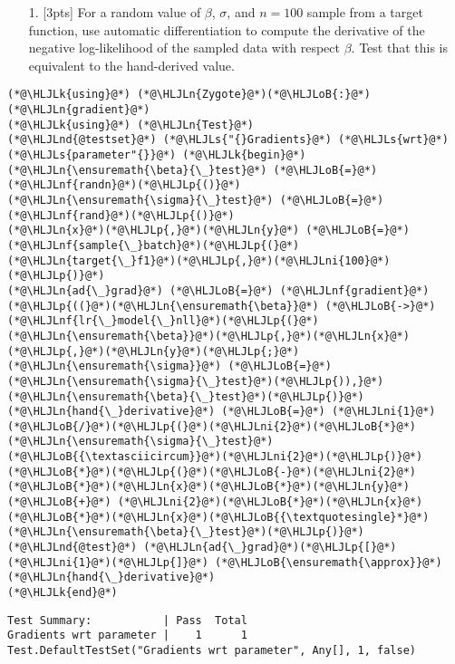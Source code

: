 \documentclass[12pt,a4paper]{article}
\newcommand{\HLJLk}[1]{\textcolor[RGB]{148,91,176}{\textbf{#1}}}
\newcommand{\HLJLn}[1]{#1}
\newcommand{\HLJLnd}[1]{\textcolor[RGB]{214,102,97}{#1}}
\newcommand{\HLJLnf}[1]{\textcolor[RGB]{66,102,213}{#1}}
\newcommand{\HLJLs}[1]{\textcolor[RGB]{201,61,57}{#1}}
\newcommand{\HLJLni}[1]{\textcolor[RGB]{59,151,46}{#1}}
\newcommand{\HLJLoB}[1]{\textcolor[RGB]{102,102,102}{\textbf{#1}}}
\newcommand{\HLJLp}[1]{#1}
\begin{document}
\begin{itemize}
\item[1. ] [3pts] For a random value of $\beta$, $\sigma$, and $n=100$ sample from a target function,  use automatic differentiation to compute the derivative of the negative log-likelihood of the sampled data  with respect $\beta$.  Test that this is equivalent to the hand-derived value.

\end{itemize}

\begin{lstlisting}
(*@\HLJLk{using}@*) (*@\HLJLn{Zygote}@*)(*@\HLJLoB{:}@*) (*@\HLJLn{gradient}@*)
(*@\HLJLk{using}@*) (*@\HLJLn{Test}@*)
(*@\HLJLnd{@testset}@*) (*@\HLJLs{"{}Gradients}@*) (*@\HLJLs{wrt}@*) (*@\HLJLs{parameter"{}}@*) (*@\HLJLk{begin}@*)
(*@\HLJLn{\ensuremath{\beta}{\_}test}@*) (*@\HLJLoB{=}@*) (*@\HLJLnf{randn}@*)(*@\HLJLp{()}@*)
(*@\HLJLn{\ensuremath{\sigma}{\_}test}@*) (*@\HLJLoB{=}@*) (*@\HLJLnf{rand}@*)(*@\HLJLp{()}@*)
(*@\HLJLn{x}@*)(*@\HLJLp{,}@*)(*@\HLJLn{y}@*) (*@\HLJLoB{=}@*) (*@\HLJLnf{sample{\_}batch}@*)(*@\HLJLp{(}@*)(*@\HLJLn{target{\_}f1}@*)(*@\HLJLp{,}@*)(*@\HLJLni{100}@*)(*@\HLJLp{)}@*)
(*@\HLJLn{ad{\_}grad}@*) (*@\HLJLoB{=}@*) (*@\HLJLnf{gradient}@*)(*@\HLJLp{((}@*)(*@\HLJLn{\ensuremath{\beta}}@*) (*@\HLJLoB{->}@*) (*@\HLJLnf{lr{\_}model{\_}nll}@*)(*@\HLJLp{(}@*)(*@\HLJLn{\ensuremath{\beta}}@*)(*@\HLJLp{,}@*)(*@\HLJLn{x}@*)(*@\HLJLp{,}@*)(*@\HLJLn{y}@*)(*@\HLJLp{;}@*)(*@\HLJLn{\ensuremath{\sigma}}@*) (*@\HLJLoB{=}@*) (*@\HLJLn{\ensuremath{\sigma}{\_}test}@*)(*@\HLJLp{)),}@*) (*@\HLJLn{\ensuremath{\beta}{\_}test}@*)(*@\HLJLp{)}@*)
(*@\HLJLn{hand{\_}derivative}@*) (*@\HLJLoB{=}@*) (*@\HLJLni{1}@*)(*@\HLJLoB{/}@*)(*@\HLJLp{(}@*)(*@\HLJLni{2}@*)(*@\HLJLoB{*}@*)(*@\HLJLn{\ensuremath{\sigma}{\_}test}@*)(*@\HLJLoB{{\textasciicircum}}@*)(*@\HLJLni{2}@*)(*@\HLJLp{)}@*)(*@\HLJLoB{*}@*)(*@\HLJLp{(}@*)(*@\HLJLoB{-}@*)(*@\HLJLni{2}@*)(*@\HLJLoB{*}@*)(*@\HLJLn{x}@*)(*@\HLJLoB{*}@*)(*@\HLJLn{y}@*) (*@\HLJLoB{+}@*) (*@\HLJLni{2}@*)(*@\HLJLoB{*}@*)(*@\HLJLn{x}@*)(*@\HLJLoB{*}@*)(*@\HLJLn{x}@*)(*@\HLJLoB{{\textquotesingle}*}@*)(*@\HLJLn{\ensuremath{\beta}{\_}test}@*)(*@\HLJLp{)}@*)
(*@\HLJLnd{@test}@*) (*@\HLJLn{ad{\_}grad}@*)(*@\HLJLp{[}@*)(*@\HLJLni{1}@*)(*@\HLJLp{]}@*) (*@\HLJLoB{\ensuremath{\approx}}@*) (*@\HLJLn{hand{\_}derivative}@*)
(*@\HLJLk{end}@*)
\end{lstlisting}

\begin{lstlisting}
Test Summary:           | Pass  Total
Gradients wrt parameter |    1      1
Test.DefaultTestSet("Gradients wrt parameter", Any[], 1, false)
\end{lstlisting}
\end{document}
